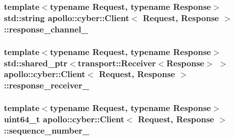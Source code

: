 \hypertarget{classapollo_1_1cyber_1_1Client_a8c0017f09d7384b81c4c82a1707f6d2f}{
\subsubsection[{response\-\_\-channel\-\_\-}]{\setlength{\rightskip}{0pt plus 5cm}template$<$typename Request, typename Response$>$ std\-::string {\bf apollo\-::cyber\-::\-Client}$<$ Request, Response $>$\-::response\-\_\-channel\-\_\-\hspace{0.3cm}{\ttfamily [private]}}}\label{classapollo_1_1cyber_1_1Client_a8c0017f09d7384b81c4c82a1707f6d2f}
\hypertarget{classapollo_1_1cyber_1_1Client_ad9afa7f2bd2f2fec4c3af05104b5d21a}{
\subsubsection[{response\-\_\-receiver\-\_\-}]{\setlength{\rightskip}{0pt plus 5cm}template$<$typename Request, typename Response$>$ std\-::shared\-\_\-ptr$<${\bf transport\-::\-Receiver}$<$Response$>$ $>$ {\bf apollo\-::cyber\-::\-Client}$<$ Request, Response $>$\-::response\-\_\-receiver\-\_\-\hspace{0.3cm}{\ttfamily [private]}}}\label{classapollo_1_1cyber_1_1Client_ad9afa7f2bd2f2fec4c3af05104b5d21a}
\hypertarget{classapollo_1_1cyber_1_1Client_a701360a2ff5dc2d4615f539e344c65f6}{
\subsubsection[{sequence\-\_\-number\-\_\-}]{\setlength{\rightskip}{0pt plus 5cm}template$<$typename Request, typename Response$>$ uint64\-\_\-t {\bf apollo\-::cyber\-::\-Client}$<$ Request, Response $>$\-::sequence\-\_\-number\-\_\-\hspace{0.3cm}{\ttfamily [private]}}}\label{classapollo_1_1cyber_1_1Client_a701360a2ff5dc2d4615f539e344c65f6}
